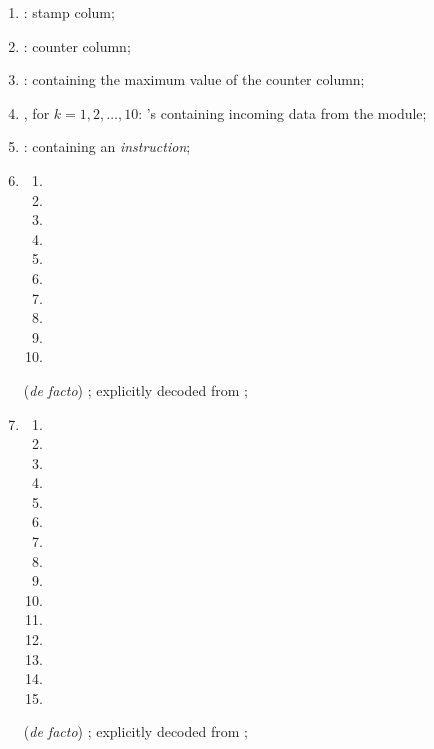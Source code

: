 \begin{enumerate}
	\item \oobStamp{}:
		stamp colum;
	\item \ct{}:
		counter column;
	\item \maxCt{}:
		\ccc{} containing the maximum value of the counter column;
	\item
		\godGiven{}
		, for $k = 1, 2, \dots, 10$:
		\ccc{}'s containing incoming data from the \hubMod{} module;
	\item
		\godGiven{}
		\oobInstruction{}:
		\ccc{} containing an \emph{\oobMod{} instruction};
	\item
		\begin{multicols}{4}
			\begin{enumerate}
				\item \oobInstIsJump{}
				\item \oobInstIsJumpI{}
				\item \oobInstIsRdc{}
				\item \oobInstIsCdl{}
				\item \oobInstIsXcall{}
				\item \oobInstIsCall{}
				\item \oobInstIsXcreate{}
				\item \oobInstIsCreate{}
				\item \oobInstIsSstore{}
				\item \oobInstIsDeployment{}
			\end{enumerate}
		\end{multicols}
		(\emph{de facto}) \ccbc{}; explicitly decoded from \oobInst{XXX};
	\item
		\begin{multicols}{3}
			\begin{enumerate}
				\item \oobInstIsEcrecover{}
				\item \oobInstIsShaTwo{}
				\item \oobInstIsRipemd{}
				\item \oobInstIsIdentity{}
				\item \oobInstIsEcadd{}
				\item \oobInstIsEcmul{}
				\item \oobInstIsEcpairing{}
				\item \oobInstIsBlakeCds{}
				\item \oobInstIsBlakeParams{}
				\item \oobInstIsModexpCds{}
				\item \oobInstIsModexpXbs{}
				\item \oobInstIsModexpLead{}
				\item \oobInstIsModexpPricing{}
				\item \oobInstIsModexpExtract{}
				\item[\vspace{\fill}]
			\end{enumerate}
		\end{multicols}
		(\emph{de facto}) \ccbc{}; explicitly decoded from ;
\end{enumerate}
